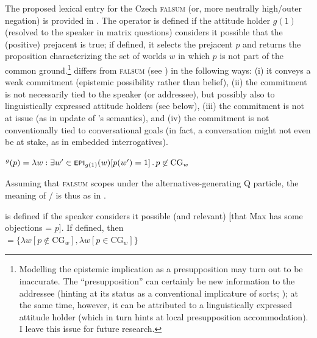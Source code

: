 \documentclass[output=paper,colorlinks,citecolor=brown]{langscibook}
\begin{document}
The proposed lexical entry for the Czech \textsc{falsum} (or, more neutrally high/outer negation) is provided in . The operator is defined if the attitude holder $g(1)$ (resolved to the speaker in matrix questions) considers it possible that the (positive) prejacent is true; if defined, it selects the prejacent $p$ and returns the proposition characterizing the set of worlds $w$ in which $p$ is not part of the common ground.\footnote{Modelling the epistemic implication as a presupposition may turn out to be inaccurate. The ``presupposition'' can certainly be new information to the addressee (hinting at its status as a conventional implicature of sorts; \citealt{Romero2015,Korotkova2023}); at the same time, however, it can be attributed to a linguistically expressed attitude holder (which in turn hints at local presupposition accommodation). I leave this issue for future research.}  differs from  \textsc{falsum} (see ) in the following ways: (i) it conveys a weak commitment (epistemic possibility rather than belief), (ii) the commitment is not necessarily tied to the speaker (or addressee), but possibly also to linguistically expressed attitude holders (see below), (iii) the commitment is not at issue (as in  update of \citeauthor{Repp2006}'s semantics), and (iv) the commitment is not conventionally tied to conversational goals (in fact, a conversation might not even be at stake, as in embedded interrogatives).

\ea{}$^g(p)=\lambda w:\exists w'\in\cnst{epi}_{g(1)}(w)[p(w')=1]\,.\,p\not\in\text{CG}_w$\label{sim:denot:falsum-cz}
\z

\noindent Assuming that \textsc{falsum} scopes under the alternatives-generating Q particle, the meaning of / is thus as in .

\ea {} is defined if the speaker considers it possible (and relevant) [that Max has some objections = $p$]. If defined, then\label{sim:ex:ne-meaning}\\
${}=\{\lambda w[p\not\in\text{CG}_w],\lambda w[p\in\text{CG}_w]\}$
\z
\end{document}

